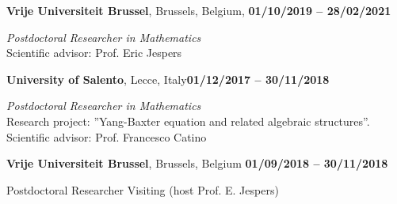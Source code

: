\documentclass[margin,line]{res}
\newenvironment{list2}{
  \begin{list}{$\bullet$}{%
      \setlength{\itemsep}{-0in}
      \setlength{\parsep}{0in} \setlength{\parskip}{0in}
      \setlength{\topsep}{0in} \setlength{\partopsep}{0in} 
      \setlength{\leftmargin}{0.2in}}}{\end{list}}
\begin{document}
\begin{resume}
\vspace{-0.1in}

{\bf Vrije Universiteit Brussel}, Brussels, Belgium, \hfill {\bf 01/10/2019 -- 28/02/2021}

\vspace{-.3cm}
{\em Postdoctoral Researcher in Mathematics} \\
{Scientific advisor: Prof. Eric Jespers}
\vspace{3pt}

\vspace{-0.1in}
{\bf University of Salento}, Lecce, Italy\hfill {\bf 01/12/2017 -- 30/11/2018}

\vspace{-.3cm}
{\em Postdoctoral Researcher in Mathematics} \\
{Research project: ”Yang-Baxter equation and related algebraic structures”.  }\\
{Scientific advisor: Prof. Francesco Catino}
\vspace{3pt}

\vspace{-0.1in}
{\bf Vrije Universiteit Brussel}, Brussels, Belgium \hfill{\bf 01/09/2018 -- 30/11/2018}

\vspace{-.3cm} 
{Postdoctoral Researcher Visiting (host Prof. E. Jespers)}


\end{resume}
\end{document}
